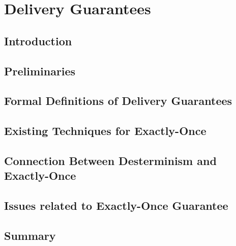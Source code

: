 \chapter{Delivery Guarantees}

\section{Introduction}

\section{Preliminaries}

\section{Formal Definitions of Delivery Guarantees}

\section{Existing Techniques for Exactly-Once}

\section{Connection Between Desterminism and Exactly-Once}

\section{Issues related to Exactly-Once Guarantee}

\section{Summary}
